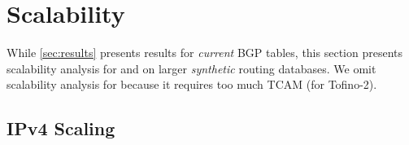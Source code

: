 \section{Scalability}
\label{sec:scalability}

While \cref{sec:results} presents results for {\em current} BGP tables, this section presents scalability analysis for \resail and \bsic on larger {\em synthetic} routing databases. We omit scalability analysis for \mashup because it requires too much TCAM (for Tofino-2).

\subsection{IPv4 Scaling} \label{subsec:ipv4_scaling}

